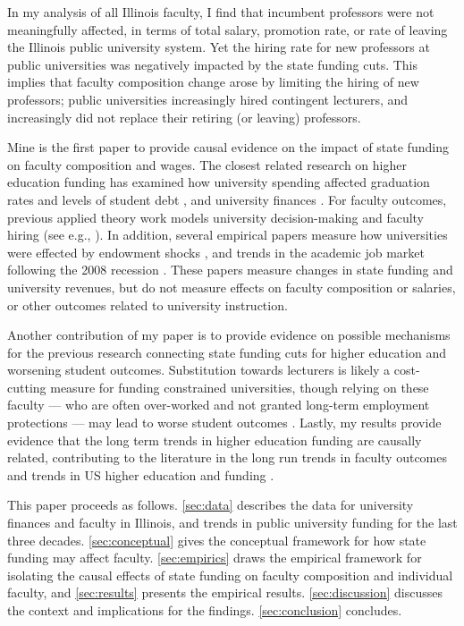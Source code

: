 In my analysis of all Illinois faculty, I find that incumbent professors were not meaningfully affected, in terms of total salary, promotion rate, or rate of leaving the Illinois public university system.
Yet the hiring rate for new professors at public universities was negatively impacted by the state funding cuts.
This implies that faculty composition change arose by limiting the hiring of new professors; public universities increasingly hired contingent lecturers, and increasingly did not replace their retiring (or leaving) professors.

Mine is the first paper to provide causal evidence on the impact of state funding on faculty composition and wages.
The closest related research on higher education funding has examined how university spending affected graduation rates and levels of student debt \citep{NBERw23736,NBERw27885}, and university finances \citep{miller2022making,bound2019public,brown2014endowment}.
For faculty outcomes, previous applied theory work models university decision-making and faculty hiring (see e.g., \citealt{abe2015implications,johnson2009jep,NBERc13879}).
In addition, several empirical papers measure how universities were effected by endowment shocks \citep{brown2014endowment}, and trends in the academic job market following the 2008 recession \citep{turner2014impact}.
These papers measure changes in state funding and university revenues, but do not measure effects on faculty composition or salaries, or other outcomes related to university instruction.

Another contribution of my paper is to provide evidence on possible mechanisms for the previous research connecting state funding cuts for higher education and worsening student outcomes.
Substitution towards lecturers is likely a cost-cutting measure for funding constrained universities, though relying on these faculty --- who are often over-worked and not granted long-term employment protections --- may lead to worse student outcomes \citep{ehrenberg2005tenured,zhu2021limited,jaeger2011examining}.
Lastly, my results provide evidence that the long term trends in higher education funding are causally related, contributing to the literature in the long run trends in faculty outcomes \citep{ehrenberg2003studying} and trends in US higher education and funding \citep{hoxby2009changing}.

This paper proceeds as follows.
\autoref{sec:data} describes the data for university finances and faculty in Illinois, and trends in public university funding for the last three decades.
\autoref{sec:conceptual} gives the conceptual framework for how state funding may affect faculty.
\autoref{sec:empirics} draws the empirical framework for isolating the causal effects of state funding on faculty composition and individual faculty, and \autoref{sec:results} presents the empirical results.
\autoref{sec:discussion} discusses the context and implications for the findings.
\autoref{sec:conclusion} concludes.
